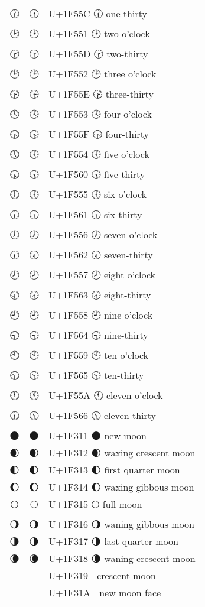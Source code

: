 \documentclass[a4paper,12pt]{ltjarticle}
\newcommand{\fontA}[1]{{\fontspec[RawFeature={mode=harf,+dist,+ccmp}]{Segoe UI Emoji} #1}}
\newcommand{\fontB}[1]{{\fontspec[RawFeature={mode=harf,+dist,+ccmp}]{Noto Color Emoji} #1}}
\begin{document}
\begin{longtable}[c]{ccp{0.8\linewidth}}
\fontA{🕜}&\fontB{🕜}&U+1F55C 🕜 one-thirty\\
\fontA{🕑}&\fontB{🕑}&U+1F551 🕑 two o’clock\\
\fontA{🕝}&\fontB{🕝}&U+1F55D 🕝 two-thirty\\
\fontA{🕒}&\fontB{🕒}&U+1F552 🕒 three o’clock\\
\fontA{🕞}&\fontB{🕞}&U+1F55E 🕞 three-thirty\\
\fontA{🕓}&\fontB{🕓}&U+1F553 🕓 four o’clock\\
\fontA{🕟}&\fontB{🕟}&U+1F55F 🕟 four-thirty\\
\fontA{🕔}&\fontB{🕔}&U+1F554 🕔 five o’clock\\
\fontA{🕠}&\fontB{🕠}&U+1F560 🕠 five-thirty\\
\fontA{🕕}&\fontB{🕕}&U+1F555 🕕 six o’clock\\
\fontA{🕡}&\fontB{🕡}&U+1F561 🕡 six-thirty\\
\fontA{🕖}&\fontB{🕖}&U+1F556 🕖 seven o’clock\\
\fontA{🕢}&\fontB{🕢}&U+1F562 🕢 seven-thirty\\
\fontA{🕗}&\fontB{🕗}&U+1F557 🕗 eight o’clock\\
\fontA{🕣}&\fontB{🕣}&U+1F563 🕣 eight-thirty\\
\fontA{🕘}&\fontB{🕘}&U+1F558 🕘 nine o’clock\\
\fontA{🕤}&\fontB{🕤}&U+1F564 🕤 nine-thirty\\
\fontA{🕙}&\fontB{🕙}&U+1F559 🕙 ten o’clock\\
\fontA{🕥}&\fontB{🕥}&U+1F565 🕥 ten-thirty\\
\fontA{🕚}&\fontB{🕚}&U+1F55A 🕚 eleven o’clock\\
\fontA{🕦}&\fontB{🕦}&U+1F566 🕦 eleven-thirty\\
\fontA{🌑}&\fontB{🌑}&U+1F311 🌑 new moon\\
\fontA{🌒}&\fontB{🌒}&U+1F312 🌒 waxing crescent moon\\
\fontA{🌓}&\fontB{🌓}&U+1F313 🌓 first quarter moon\\
\fontA{🌔}&\fontB{🌔}&U+1F314 🌔 waxing gibbous moon\\
\fontA{🌕}&\fontB{🌕}&U+1F315 🌕 full moon\\
\fontA{🌖}&\fontB{🌖}&U+1F316 🌖 waning gibbous moon\\
\fontA{🌗}&\fontB{🌗}&U+1F317 🌗 last quarter moon\\
\fontA{🌘}&\fontB{🌘}&U+1F318 🌘 waning crescent moon\\
\fontA{🌙}&\fontB{🌙}&U+1F319 🌙 crescent moon\\
\fontA{🌚}&\fontB{🌚}&U+1F31A 🌚 new moon face\\

\end{longtable}
\end{document}
